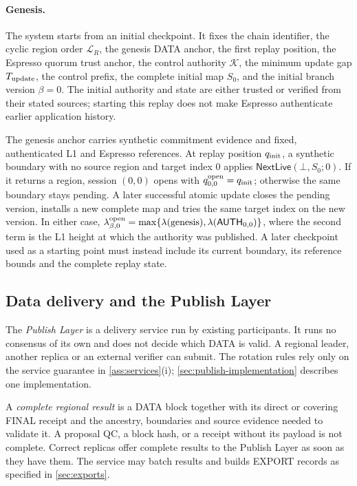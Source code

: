 \documentclass[11pt,a4paper]{article}
\newcommand{\tagg}[1]{\ensuremath{\mathsf{#1}}}
\newcommand{\defterm}[1]{\textcolor{rrBlue}{\textit{#1}}}
\begin{document}
\paragraph{Genesis.}
The system starts from an initial checkpoint. It fixes the chain
identifier, the cyclic region order $\mathcal L_R$, the genesis DATA
anchor, the first replay position, the Espresso quorum trust anchor,
the control authority $\mathcal K$, the minimum update gap
$T_{\rm update}$, the control prefix, the complete initial map $S_0$,
and the initial branch version $\beta=0$. The initial
authority and state are either trusted or verified from their stated
sources; starting this replay does not make Espresso authenticate
earlier application history.

The genesis anchor carries synthetic commitment evidence and fixed,
authenticated L1 and Espresso references. At replay position
$q_{\rm init}$, a synthetic boundary with no source region and target
index 0 applies $\tagg{NextLive}(\bot,S_0;0)$. If it returns a region,
session $(0,0)$ opens with $q^{\rm open}_{0,0}=q_{\rm init}$; otherwise
the same boundary stays pending. A later successful atomic update closes
the pending version, installs a new complete map and tries the same target
index on the new version. In either case,
$\lambda^{\rm open}_{\beta,0}=\max\{\lambda(\text{genesis}),
\lambda(\tagg{AUTH}_{0,0})\}$, where the second term is the L1 height
at which the authority was published. A later checkpoint used as a
starting point must instead include its current boundary, its reference
bounds and the complete replay state.

\subsection{Data delivery and the Publish Layer}
\label{sec:delivery}
The \defterm{Publish Layer} is a delivery service run by existing
participants. It runs no consensus of its own and does not decide which
DATA is valid. A regional leader, another replica or an external
verifier can submit. The rotation rules rely only on the service
guarantee in \cref{ass:services}(i); \cref{sec:publish-implementation}
describes one implementation.

A \defterm{complete regional result} is a DATA block together with its
direct or covering FINAL receipt and the ancestry, boundaries and source
evidence needed to validate it. A proposal QC, a block hash, or a receipt
without its payload is not complete. Correct replicas offer complete
results to the Publish Layer as soon as they have them. The service may
batch results and builds EXPORT records as specified in
\cref{sec:exports}.
\end{document}
